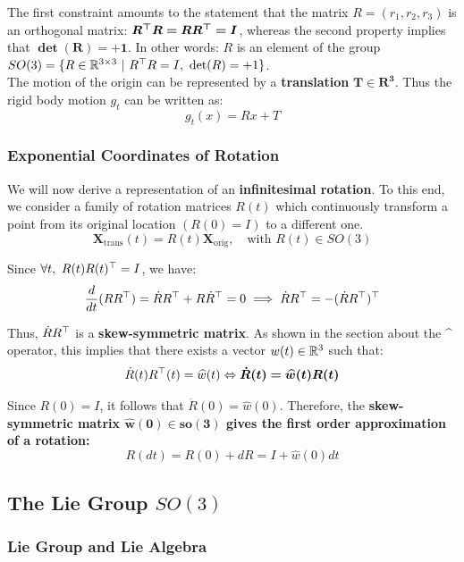 The first constraint amounts to the statement that the matrix
$R = (r_1, r_2, r_3)$ is an orthogonal matrix: $\bm{R^{\top}R=RR^{\top}=I}$,
whereas the second property implies that $\bm{\det(R) = +1}$.
In other words: $R$ is an element of the group
$SO(3) = \{R \in \mathbb{R}^{3 \times{} 3}\ |\ R^{\top}R=I,\ \det(R) = +1\}$.\\

The motion of the origin can be represented by a \textbf{translation}
$\bm{T \in R^3}$. Thus the rigid body motion $g_t$ can be written as:
	\[g_t(x) = Rx + T\]


\subsubsection{Exponential Coordinates of Rotation}
\label{ssub:exponential_coordinates_of_rotation}

We will now derive a representation of an \textbf{infinitesimal rotation}.
To this end, we consider a family of rotation matrices $R(t)$
which continuously transform a point from its original location
$(R(0) = I)$ to a different one.
	\[\bm{X}_{\text{trans}}(t) = R(t)\bm{X}_{\text{orig}}, \quad
	\text{with } R(t) \in SO(3)\]

Since $\forall t,\ R(t)R(t)^{\top} = I$, we have:
	\[\frac{d}{dt}(RR^{\top}) = \dot{R}R^{\top} + R\dot{R}^{\top}= 0
	\implies \dot{R}R^{\top} = -( \dot{R}R^{\top} )^{\top}\]

Thus, $\dot{R}R^{\top}$ is a \textbf{skew-symmetric matrix}.
As shown in the section about the \^{} operator, this implies that
there exists a vector $w(t) \in \mathbb{R}^3$ such that:
	\[\dot{R}(t)R^{\top}(t) = \widehat{w}(t)
	\Leftrightarrow \bm{ \dot{R}(t) = \widehat{w}(t)R(t)}\]

Since $R(0) = I$, it follows that $\dot{R}(0) = \widehat{w}(0)$.
Therefore, the \textbf{skew-symmetric matrix $\bm{\widehat{w}(0) \in so(3)}$
gives the first order approximation of a rotation:}
	\[R(dt) = R(0) + dR = I + \widehat{w}(0) dt\]


\subsection{The Lie Group $SO(3)$}
\label{sub:the_lie_group_so_3_}


\subsubsection{Lie Group and Lie Algebra}
\label{ssub:lie_group_and_lie_algebra}


